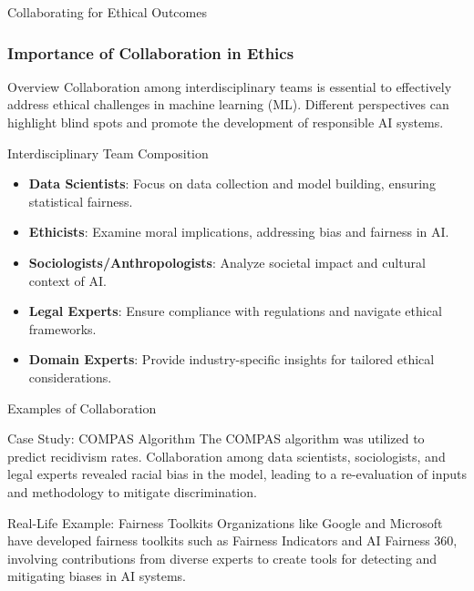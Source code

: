 \documentclass[aspectratio=169]{beamer}
\begin{document}
\begin{frame}[fragile]{Collaborating for Ethical Outcomes}
    \frametitle{Importance of Collaboration in Ethics}
    \begin{block}{Overview}
        Collaboration among interdisciplinary teams is essential to effectively address ethical challenges in machine learning (ML). Different perspectives can highlight blind spots and promote the development of responsible AI systems.
    \end{block}
\end{frame}

\begin{frame}[fragile]{Interdisciplinary Team Composition}
    \begin{itemize}
        \item \textbf{Data Scientists}: Focus on data collection and model building, ensuring statistical fairness.
        \item \textbf{Ethicists}: Examine moral implications, addressing bias and fairness in AI.
        \item \textbf{Sociologists/Anthropologists}: Analyze societal impact and cultural context of AI.
        \item \textbf{Legal Experts}: Ensure compliance with regulations and navigate ethical frameworks.
        \item \textbf{Domain Experts}: Provide industry-specific insights for tailored ethical considerations.
    \end{itemize}
\end{frame}

\begin{frame}[fragile]{Examples of Collaboration}
    \begin{block}{Case Study: COMPAS Algorithm}
        The COMPAS algorithm was utilized to predict recidivism rates. Collaboration among data scientists, sociologists, and legal experts revealed racial bias in the model, leading to a re-evaluation of inputs and methodology to mitigate discrimination.
    \end{block}
    
    \begin{block}{Real-Life Example: Fairness Toolkits}
        Organizations like Google and Microsoft have developed fairness toolkits such as Fairness Indicators and AI Fairness 360, involving contributions from diverse experts to create tools for detecting and mitigating biases in AI systems.
    \end{block}
\end{frame}
\end{document}
